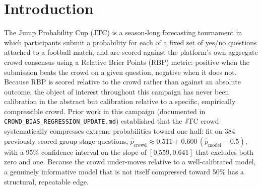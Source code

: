 \documentclass[11pt]{article}
\begin{document}
\begin{abstract}
expensive repeated error of the campaign (net $-155.64$ relative Brier points across
five prior matches), a risk this match faces acutely on two of its fifteen questions
given the complete absence of a market anchor. Section \ref{sec:marketrevision}
documents a subsequent revision of these estimates after live external market data was
retrieved. An initial check of the JTC platform's own web API was misread as showing a
still-unformed crowd consensus; a follow-up validation against markets with known trade
activity and known settlement outcomes shows this reading was incorrect, and that the
field in question is a binary open/settled flag rather than a probability at all---this
project's pre-existing finding that the pre-close crowd consensus is simply not
observable via any known API endpoint stands uncorrected. A public Smarkets sharp-market
query, unaffected by this issue, supplied a real, liquid price for twelve of the fifteen
questions, most consequentially raising the match-winner estimate from an
ordered-logit-only 0.52 to a market-anchored 0.60.
\end{abstract}

\section{Introduction}

The Jump Probability Cup (JTC) is a season-long forecasting tournament in which
participants submit a probability for each of a fixed set of yes/no questions attached to
a football match, and are scored against the platform's own aggregate crowd consensus
using a Relative Brier Points (RBP) metric: positive when the submission beats the crowd
on a given question, negative when it does not. Because RBP is scored relative to the
crowd rather than against an absolute outcome, the object of interest throughout this
campaign has never been calibration in the abstract but calibration relative to a
specific, empirically compressible crowd. Prior work in this campaign (documented in
\texttt{CROWD\_BIAS\_REGRESSION\_UPDATE.md}) established that the JTC crowd systematically
compresses extreme probabilities toward one half: fit on 384 previously scored group-stage
questions, $\hat p_{\text{crowd}} \approx 0.511 + 0.600\,(\hat p_{\text{model}} - 0.5)$,
with a 95\% confidence interval on the slope of $[0.559, 0.641]$ that excludes both zero
and one. Because the crowd under-moves relative to a well-calibrated model, a genuinely
informative model that is not itself compressed toward 50\% has a structural, repeatable
edge.
\end{document}
